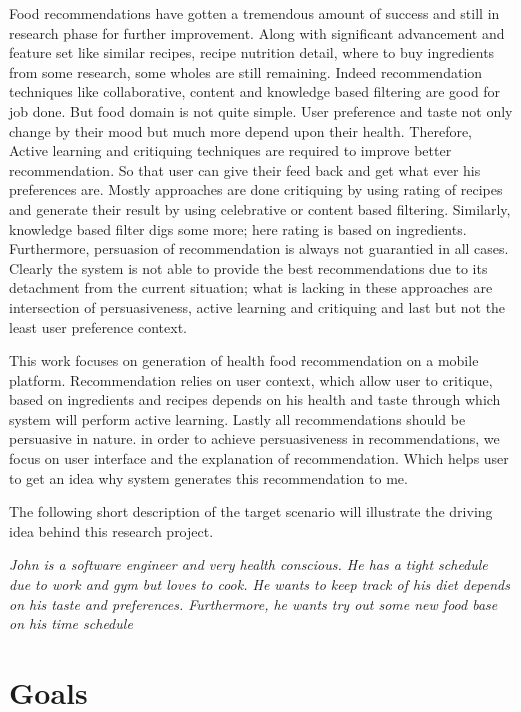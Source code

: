 Food recommendations have gotten a tremendous amount of success and still in research phase for further improvement. Along with significant advancement and feature set like similar recipes, recipe nutrition detail, where to buy ingredients from some research, some wholes are still remaining. Indeed recommendation techniques like collaborative, content and knowledge based filtering are good for job done. But food domain is not quite simple. User preference and taste not only change by their mood but much more depend upon their health. Therefore, Active learning and critiquing techniques are required to improve better recommendation. So that user can give their feed back and get what ever his preferences are. Mostly approaches are done critiquing by using rating of recipes and generate their result by using celebrative or content based filtering. Similarly, knowledge based filter digs some more; here rating is based on ingredients. Furthermore, persuasion of recommendation is always not guarantied in all cases. Clearly the system is not able to provide the best recommendations due to its detachment from the current situation; what is lacking in these approaches are intersection of persuasiveness, active learning and critiquing and last but not the least user preference context.\newline

This work focuses on generation of health food recommendation on a mobile platform. Recommendation relies on user context, which allow user to critique, based on ingredients and recipes depends on his health and taste through which system will perform active learning. Lastly all recommendations should be persuasive in nature. in order to achieve persuasiveness in recommendations, we focus on user interface and the explanation of recommendation. Which helps user to get an idea why system generates this recommendation to me.\newline

The following short description of the target scenario will illustrate the driving idea behind this research project.\newline

 \textit{John is a software engineer and very health conscious. He has a tight schedule due to work and gym but loves to cook. He wants to keep track of his diet depends on his taste and preferences. Furthermore, he wants try out some new food base on his time schedule}\newline

\section{Goals}

